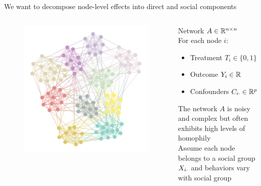 \documentclass[aspectratio=169]{beamer}
\theoremstyle{remark}
\begin{document}
\begin{frame}{We want to decompose node-level effects into direct and social components}
    \begin{columns}
        \begin{column}{0.4\textwidth}
            \begin{figure}
                \centering
                \includegraphics[width=\textwidth]{./figures/assortative.png}
            \end{figure}
        \end{column}
        \begin{column}{0.6\textwidth}
            Network $A \in \mathbb{R}^{n \times n}$ \\
            \vspace{2mm}
            For each node $i$:
            \begin{itemize}
                \item Treatment $T_i \in \{0, 1\}$
                \item Outcome $Y_i \in \mathbb{R}$
                \item Confounders $C_{i \cdot} \in \mathbb{R}^p$
            \end{itemize}
            \vspace{2mm}
            The network $A$ is noisy and complex but often exhibits high levels of homophily \\
            \vspace{2mm}
            \pause
            Assume each node belongs to a social group $X_{i \cdot}$ and behaviors vary with social group
        \end{column}
    \end{columns}
\end{frame}
\end{document}
